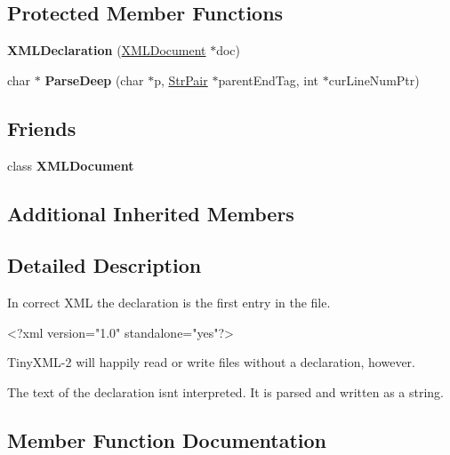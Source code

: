 \subsection*{Protected Member Functions}
\begin{DoxyCompactItemize}
\item 
\mbox{\label{classtinyxml2_1_1_x_m_l_declaration_aef9586f2ce5df5feba74dde49a242b06}} 
{\bfseries X\+M\+L\+Declaration} (\mbox{\hyperlink{classtinyxml2_1_1_x_m_l_document}{X\+M\+L\+Document}} $\ast$doc)
\item 
\mbox{\label{classtinyxml2_1_1_x_m_l_declaration_a42a2a36f4d78dc745063b79c16538b9b}} 
char $\ast$ {\bfseries Parse\+Deep} (char $\ast$p, \mbox{\hyperlink{classtinyxml2_1_1_str_pair}{Str\+Pair}} $\ast$parent\+End\+Tag, int $\ast$cur\+Line\+Num\+Ptr)
\end{DoxyCompactItemize}
\subsection*{Friends}
\begin{DoxyCompactItemize}
\item 
\mbox{\label{classtinyxml2_1_1_x_m_l_declaration_a4eee3bda60c60a30e4e8cd4ea91c4c6e}} 
class {\bfseries X\+M\+L\+Document}
\end{DoxyCompactItemize}
\subsection*{Additional Inherited Members}


\subsection{Detailed Description}
In correct X\+ML the declaration is the first entry in the file. \begin{DoxyVerb}    <?xml version="1.0" standalone="yes"?>
\end{DoxyVerb}


Tiny\+X\+M\+L-\/2 will happily read or write files without a declaration, however.

The text of the declaration isn\textquotesingle{}t interpreted. It is parsed and written as a string. 

\subsection{Member Function Documentation}
\mbox{\label{classtinyxml2_1_1_x_m_l_declaration_acf47629d9fc08ed6f1c164a97bcf794b}} 
